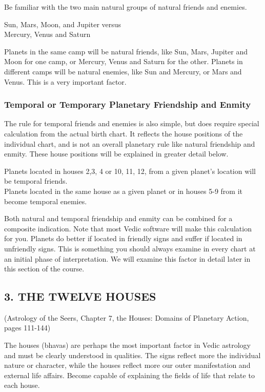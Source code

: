  

Be familiar with the two main natural groups of natural friends and enemies.

Sun, Mars, Moon, and Jupiter versus \\
Mercury, Venus and Saturn
 

Planets in the same camp will be natural friends, like Sun, Mars, Jupiter and Moon for one camp, or Mercury, Venus and Saturn for the other. Planets in different camps will be natural enemies, like Sun and Mercury, or Mars and Venus. This is a very important factor.

 

\subsubsection{Temporal or Temporary Planetary Friendship and Enmity}

 

The rule for temporal friends and enemies is also simple, but does require special calculation from the actual birth chart. It reflects the house positions of the individual chart, and is not an overall planetary rule like natural friendship and enmity. These house positions will be explained in greater detail below.

 

Planets located in houses 2,3, 4 or 10, 11, 12, from a given planet’s location will be temporal friends.\\
Planets located in the same house as a given planet or in houses 5-9 from it become temporal enemies.
 

Both natural and temporal friendship and enmity can be combined for a composite indication. Note that most Vedic software will make this calculation for you. Planets do better if located in friendly signs and suffer if located in unfriendly signs. This is something you should always examine in every chart at an initial phase of interpretation. We will examine this factor in detail later in this section of the course.

 

\subsection{3. THE TWELVE HOUSES} (Astrology of the Seers, Chapter 7, the Houses: Domains of Planetary Action, pages 111-144)


The houses (bhavas) are perhaps the most important factor in Vedic astrology and must be clearly understood in qualities. The signs reflect more the individual nature or character, while the houses reflect more our outer manifestation and external life affairs. Become capable of explaining the fields of life that relate to each house.

